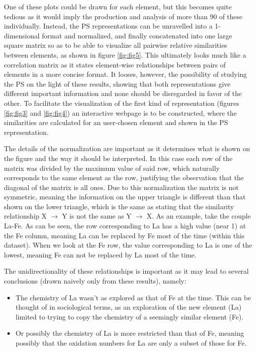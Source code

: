 \documentclass[]{article}
\begin{document}
One of these plots could be drawn for each element, but this becomes quite tedious as it would imply the production and analysis of more than 90 of these individually. Instead, the PS representations can be unravelled into a 1-dimensional format and normalized, and finally concatenated into one large square matrix so as to be able to visualize all pairwise relative similarities between elements, as shown in figure \ref{fig:fig5}. This ultimately looks much like a correlation matrix as it states element-wise relationships between pairs of elements in a more concise format. It looses, however, the possibility of studying the PS on the light of these results, showing that both representations give different important information and none should be disregarded in favor of the other. To facilitate the visualization of the first kind of representation (figures \ref{fig:fig3} and \ref{fig:fig4}) an interactive webpage is to be constructed, where the similarities are calculated for an user-chosen element and shown in the PS representation.
 
The details of the normalization are important as it determines what is shown on the figure and the way it should be interpreted. In this case each row of the matrix was divided by the maximum value of said row, which naturally corresponds to the same element as the row, justifying the observation that the diagonal of the matrix is all ones. Due to this normalization the matrix is not symmetric, meaning the information on the upper triangle is different than that shown on the lower triangle, which is the same as stating that the similarity relationship X $\rightarrow$ Y is not the same as Y $\rightarrow$ X. As an example, take the couple La-Fe. As can be seen, the row corresponding to La has a high value (near 1) at the Fe column, meaning La can be replaced by Fe most of the time (within this dataset). When we look at the Fe row, the value corresponding to La is one of the lowest, meaning Fe can not be replaced by La most of the time. 

The unidirectionality of these relationships is important as it may lead to several conclusions (drawn naively only from these results), namely:

\begin{itemize}
	\item The chemistry of La wasn't as explored as that of Fe at the time. This can be thought of in sociological terms, as an exploration of the new element (La) limited to trying to copy the chemistry of a seemingly similar element (Fe).
	\item Or possibly the chemistry of La is more restricted than that of Fe, meaning possibly that the oxidation numbers for La are only a subset of those for Fe.
\end{itemize}
\end{document}
